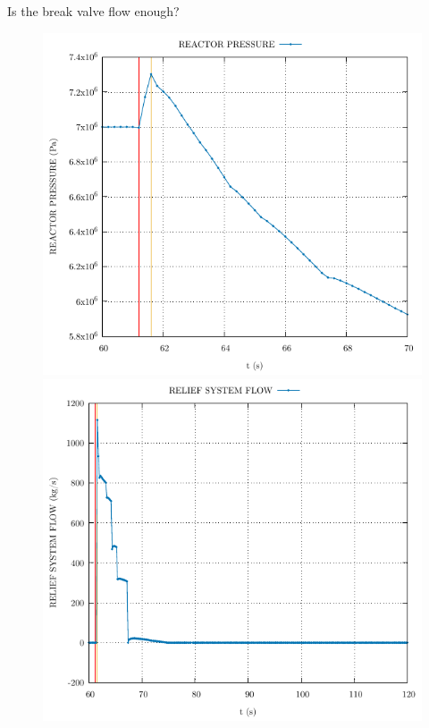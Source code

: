 \begin{frame}{Is the break valve flow enough?}
\begin{figure}
	\centering
	\begin{minipage}{.5\textwidth}
		\centering
		\includegraphics[width=0.7\linewidth]{./graphs/REACTOR PRESSURE_start.pdf}
	\end{minipage}%
	\begin{minipage}{.5\textwidth}
		\centering
		\includegraphics[width=.7\linewidth]{./graphs/RELIEF SYSTEM FLOW.pdf}
	\end{minipage}
\end{figure}
\vspace{-10pt}
\begin{figure}
	\centering
	\begin{minipage}{.5\textwidth}
		\centering

\end{minipage}
\end{figure}
\end{frame}
